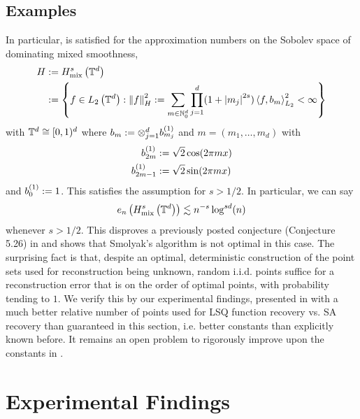 \documentclass[12pt, oneside]{amsart}
\theoremstyle{definition}
\theoremstyle{remark}
\numberwithin{equation}{section}
\begin{document}
\subsection*{Examples}
In particular,  is satisfied for the 
approximation numbers on the Sobolev space of dominating mixed smoothness, 
\begin{align*}
    H &\defn H_{\text{mix}}^s\left(\T^d\right)\\
    &\defn \set{f \in L_2\left(\T^d\right) : \norm[H]{f}^2 \defn \sum_{m \in 
    \N_0^d} \prod_{j=1}^d (1+\abs{m_j}^{2s}) \inner{f}{b_m}^2_{L_2} < \infty}
\end{align*}
with \(\T^d \cong [0, 1)^d\) 
where \(b_m \defn \otimes_{j=1}^d b_{m_j}^{(1)}\) and \(m = (m_1, \dots, m_d)\) with \begin{align*}
    b_{2m}^{(1)} &\defn \sqrt{2}\cos(2\pi m x)\\
    b_{2m-1}^{(1)} &\defn \sqrt{2}\sin(2\pi m x)
\end{align*}
and \(b_0^{(1)} \defn 1\). This satisfies the assumption for \(s > 1/2\). In 
particular, we can say
\begin{equation}\label{eq:conclusio}
    e_n\left( H_{\text{mix}}^s\left(\T^d\right) \right) \lesssim n^{-s}\log^{sd}(n)
\end{equation}
whenever \(s > 1/2\). This disproves a previously posted conjecture (Conjecture 
5.26) in \cite{Dung_Temlyakov_Ullrich_2018} and shows that Smolyak's algorithm 
is not optimal in this case. The surprising fact is that, despite an optimal, 
deterministic construction of the point sets used for reconstruction being 
unknown, random i.i.d. points suffice for a reconstruction error that is on the 
order of optimal points, with probability tending to \(1\). We verify this by 
our experimental findings, presented in  with a 
much better relative number of points used for LSQ function recovery vs. SA 
recovery than guaranteed in this section, i.e. better constants than explicitly 
known before. It remains an open problem to rigorously improve upon the 
constants in .
\section{Experimental Findings}\label{sec:experimentalFindings}

\end{document}
